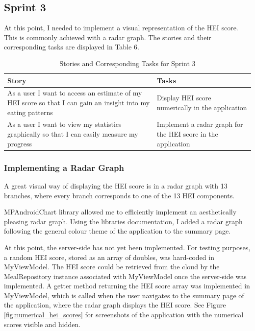 \documentclass{article}
\begin{document}
\subsection{Sprint 3}
At this point, I needed to implement a visual representation of the HEI score. This is commonly achieved with a radar graph. The stories and their corresponding tasks are displayed in Table 6.

\begin{table}[h]
\centering
\hspace*{-2.1cm}
\begin{tabular}{||m{6cm}|m{9cm}||}
\hline
    Story & Tasks \\ [0.5ex] 
    \hline
    As a user I want to access an estimate of my HEI score so that I can gain an insight into my eating patterns & Display HEI score numerically in the application\\
    \hline
    As a user I want to view my statistics graphically so that I can easily measure my progress & Implement a radar graph for the HEI score in the application \\
\hline
\end{tabular}
\caption{Stories and Corresponding Tasks for Sprint 3}
\label{table:stories_tasks_sprint_3}
\end{table}

\subsubsection{Implementing a Radar Graph}
A great visual way of displaying the HEI score is in a radar graph with 13 branches, where every branch corresponds to one of the 13 HEI components.

\bigskip
\noindent MPAndroidChart library \cite{library_mpandroidchart} allowed me to efficiently implement an aesthetically pleasing radar graph. Using the libraries documentation, I added a radar graph following the general colour theme of the application to the summary page. 

\bigskip
\noindent At this point, the server-side has not yet been implemented. For testing purposes, a random HEI score, stored as an array of doubles, was hard-coded in MyViewModel. The HEI score could be retrieved from the cloud by the MealRepository instance associated with MyViewModel once the server-side was implemented. A getter method returning the HEI score array was implemented in MyViewModel, which is called when the user navigates to the summary page of the application, where the radar graph displays the HEI score. See Figure \ref{fig:numerical_hei_scores} for screenshots of the application with the numerical scores visible and hidden. 
\end{document}
